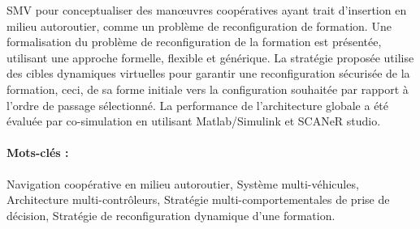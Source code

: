 SMV pour conceptualiser des manœuvres coopératives ayant trait d'insertion en milieu autoroutier, comme un problème de reconfiguration de formation. Une formalisation du problème de reconfiguration de la formation est présentée, utilisant une approche formelle, flexible et générique. La stratégie proposée utilise des cibles dynamiques virtuelles pour garantir une reconfiguration sécurisée de la formation, ceci, de sa forme initiale vers la configuration souhaitée par rapport à l'ordre de passage sélectionné. La performance de l'architecture globale a été évaluée par co-simulation en utilisant Matlab/Simulink et SCANeR studio.
        \vspace{-0.3cm}

 \paragraph*{ Mots-clés :}  Navigation coopérative en milieu autoroutier, Système multi-véhicules, Architecture multi-contrôleurs, Stratégie multi-comportementales de prise de décision, Stratégie de reconfiguration dynamique d'une formation.
 \clearpage
